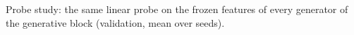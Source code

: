 \begin{table}[htbp]
\centering
\caption[Probe study]{Probe study: the same linear probe on the frozen features of every generator of the generative block (validation, mean over seeds).}
\label{tab:transfer_probe_study}
\small
\begin{adjustbox}{max width=\textwidth}

\end{adjustbox}
\end{table}
